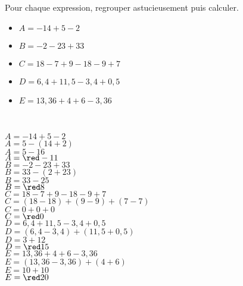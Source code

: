 \begin{exercice*}
   Pour chaque expression, regrouper astucieusement puis calculer.
   \begin{itemize}
      \item[] $A =-14+5-2$
      \item[] $B =-2-23+33$
      \item[] $C =18-7+9-18-9+7$
      \item[] $D =6,4+11,5-3,4+0,5$
      \item[] $E =13,36+4+6-3,36$
   \end{itemize}
\end{exercice*}

\begin{corrige}
   \ \\   
   \begin{itemize}
      \def\item{}
      \item $A =-14+5-2         $\\$A =5-(14+2)            $\\$A =5-16  $\\$A =\red -11$\\\smallskip
      \item $B =-2-23+33        $\\$B =33-(2+23)           $\\$B =33-25 $\\$B =\red 8$\\\smallskip
      \item $C =18-7+9-18-9+7   $\\$C =(18-18)+(9-9)+(7-7) $\\$C =0+0+0 $\\$C =\red 0$\\\smallskip
      \item $D =6,4+11,5-3,4+0,5$\\$D =(6,4-3,4)+(11,5+0,5)$\\$D =3+12  $\\$D =\red 15$\\\smallskip
      \item $E =13,36+4+6-3,36  $\\$E =(13,36-3,36)+(4+6)  $\\$E =10+10 $\\$E =\red 20$
   \end{itemize}
\end{corrige}

